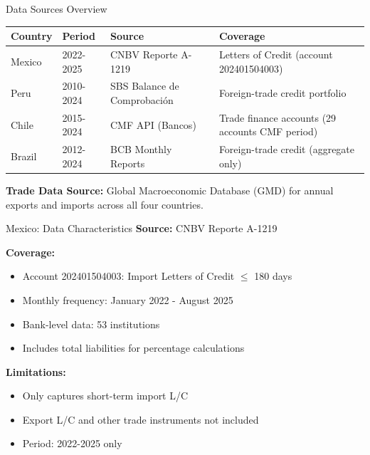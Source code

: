 \documentclass[aspectratio=169,11pt]{beamer}
\begin{document}
\begin{frame}{Data Sources Overview}
\begin{table}[h]
\centering
\small
\begin{tabular}{lllp{5cm}}
\toprule
\textbf{Country} & \textbf{Period} & \textbf{Source} & \textbf{Coverage} \\
\midrule
Mexico & 2022-2025 & CNBV Reporte A-1219 & Letters of Credit (account 202401504003) \\
Peru & 2010-2024 & SBS Balance de Comprobación & Foreign-trade credit portfolio \\
Chile & 2015-2024 & CMF API (Bancos) & Trade finance accounts (29 accounts CMF period) \\
Brazil & 2012-2024 & BCB Monthly Reports & Foreign-trade credit (aggregate only) \\
\bottomrule
\end{tabular}
\end{table}

\vspace{0.5cm}
\textbf{Trade Data Source:} Global Macroeconomic Database (GMD) for annual exports and imports across all four countries.
\end{frame}

\begin{frame}{Mexico: Data Characteristics}
\textbf{Source:} CNBV Reporte A-1219

\vspace{0.3cm}
\textbf{Coverage:}
\begin{itemize}
    \item Account 202401504003: Import Letters of Credit $\leq$ 180 days
    \item Monthly frequency: January 2022 - August 2025
    \item Bank-level data: 53 institutions
    \item Includes total liabilities for percentage calculations
\end{itemize}

\vspace{0.3cm}
\textbf{Limitations:}
\begin{itemize}
    \item Only captures short-term import L/C
    \item Export L/C and other trade instruments not included
    \item Period: 2022-2025 only
\end{itemize}
\end{frame}
\end{document}
